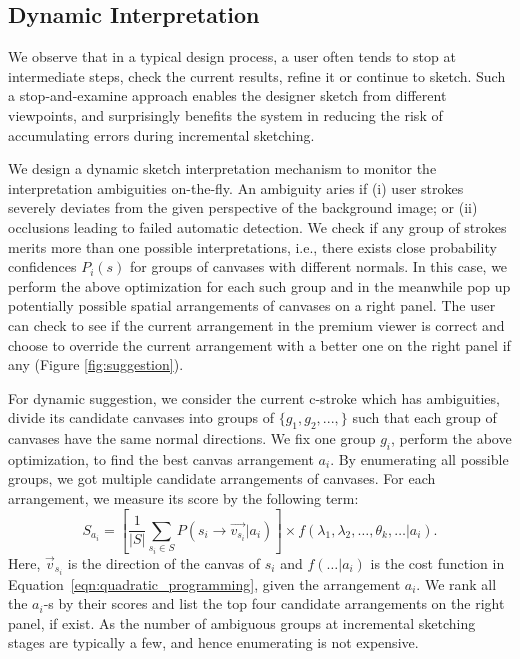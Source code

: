 {\subsection{Dynamic Interpretation}

We observe that in a typical design process, a user often tends to stop at intermediate steps, check the current results, refine it or continue to sketch. Such a stop-and-examine approach enables the designer sketch from different viewpoints, and surprisingly benefits the system in reducing the risk of accumulating errors during incremental sketching.

We design a dynamic sketch interpretation mechanism to
monitor the interpretation ambiguities on-the-fly. An ambiguity aries if (i) user strokes severely deviates from the given perspective of the background image; or (ii) occlusions leading to failed automatic detection. We check if any group of strokes merits more than one possible interpretations, i.e., there exists close probability confidences $P_i(s)$ for groups of canvases with different normals. In this case, we perform the above optimization for each such group and in the meanwhile pop up potentially possible spatial arrangements of canvases on a right panel. The user can check to see if the current arrangement in the premium viewer is correct and choose to override the current arrangement with a better one on the right panel if any (Figure \ref{fig:suggestion}).

For dynamic suggestion, we consider the current c-stroke which has ambiguities, divide its candidate canvases into groups of $\{g_1, g_2, ..., \}$ such that each group of canvases have the same normal directions. We fix one group $g_i$, perform the above optimization, to find the best canvas arrangement $a_i$. By enumerating all possible groups, we got multiple candidate arrangements of canvases. For each arrangement, we measure its score by the following term:
\begin{equation}
S_{a_i} = [\frac{1}{|S|}\sum_{s_i \in S}P(s_i \rightarrow \vec{v_{s_i}} | a_i)] \times f(\lambda_1, \lambda_2, \dots, \theta_k, \dots | a_i).
\end{equation}
Here, $\vec{v}_{s_i}$ is the direction of the canvas of $s_i$ and $f(\dots | a_i)$ is the cost function in Equation~\ref{eqn:quadratic_programming}, given the arrangement $a_i$. We rank all the $a_i$-s by their scores and list the top four candidate arrangements on the right panel, if exist. As the number of ambiguous groups at incremental sketching stages are typically a few, and hence enumerating is not expensive.


}
